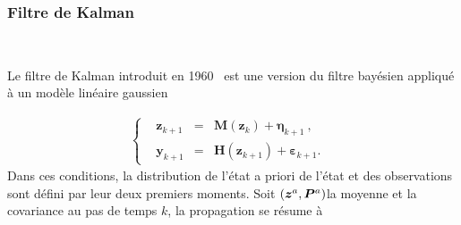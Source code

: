 



\subsubsection{Filtre de Kalman}~\label{kalman_filter}

Le filtre de Kalman introduit en 1960~\cite{kalman_new_1960} est une version du filtre bayésien appliqué à un modèle linéaire gaussien

\begin{gather*}
    \left\{\begin{aligned}
         & \bm{z}_{k+1} & = & \bm M(\bm{z}_{k}) + \bm{\eta}_{k+1}     ~    , & \\
         & \bm{y}_{k+1} & = & \bm H(\bm{z}_{k+1}) + \bm{\varepsilon}_{k+1}.  &
    \end{aligned} \right.
\end{gather*}Dans ces conditions, la distribution de l'état a priori de l'état et des observations sont défini par leur deux premiers moments. Soit $(\bm z^a,\bm  P^a)$la moyenne et la covariance au pas de temps $k$, la propagation se résume à

